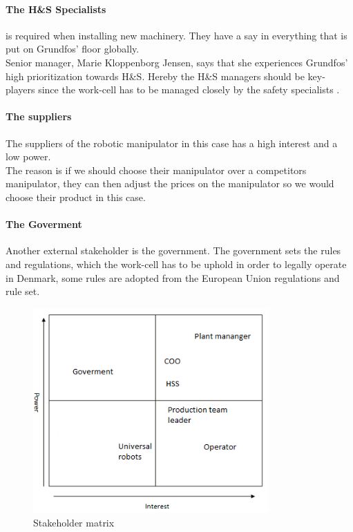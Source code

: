 \paragraph{The H\&S Specialists}\label{ch:SafetyPersonel} 
 is required when installing new machinery. They have a say in everything that is put on Grundfos' floor globally.\\ 
Senior manager, Marie Kloppenborg Jensen, says that she experiences Grundfos' high prioritization towards H\&S. Hereby the H\&S managers should be key-players since the work-cell has to be managed closely by the safety specialists \cite{H&S}.

\paragraph{The suppliers}\label{ch:Universalrobots-stake}
The suppliers of the robotic manipulator in this case has a high interest and a low power.\\The reason is if we should choose their manipulator over a competitors manipulator, they can then adjust the prices on the manipulator so we would choose their product in this case.

\paragraph{The Goverment}\label{ch:Goverment-requriement}
Another external stakeholder is the government. The government sets the rules and regulations, which the work-cell has to be uphold in order to legally operate in Denmark, some rules are adopted from the European Union regulations and rule set.\\

\begin{figure}[h]
    \centering
     \includegraphics[width=9cm]{StakeholderAnalysis/matrix.PNG}
    \caption{Stakeholder matrix}
    \label{fig:Stackholder matrix}
\end{figure}

